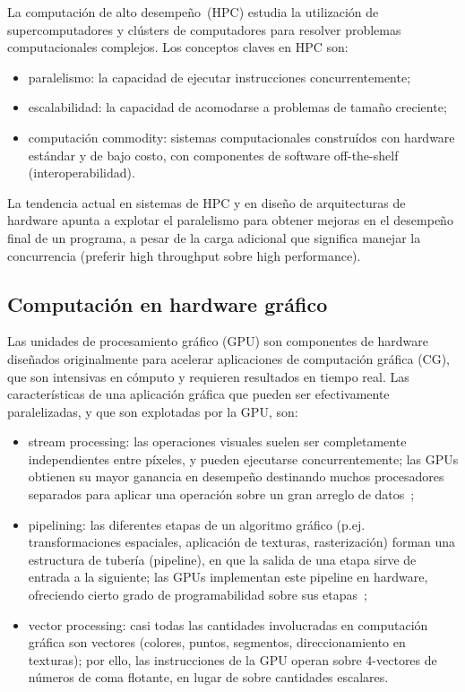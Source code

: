 \documentclass[11pt,spanish]{article}
\begin{document}
La computación de alto desempeño~(HPC) estudia la utilización de supercomputadores y
clústers de computadores para resolver problemas computacionales complejos.  Los
conceptos claves en HPC son:
\begin{itemize}
   \item paralelismo:
     la capacidad de ejecutar instrucciones concurrentemente;
   \item escalabilidad:
     la capacidad de acomodarse a problemas de tamaño creciente;
   \item computación commodity:
     sistemas computacionales construídos con hardware
     estándar y de bajo costo, con componentes de software off-the-shelf
     (interoperabilidad).
\end{itemize}
La tendencia actual en sistemas de HPC y en diseño de arquitecturas de hardware
apunta a explotar el paralelismo para obtener mejoras en el desempeño final de un
programa, a pesar de la carga adicional que significa manejar la concurrencia
(preferir high throughput sobre high performance).

\subsection{Computación en hardware gráfico}
Las unidades de procesamiento gráfico (GPU) son componentes de hardware diseñados
originalmente para acelerar aplicaciones de computación gráfica (CG), que son
intensivas en cómputo y requieren resultados en tiempo real.  Las
características de una aplicación gráfica que pueden ser efectivamente
paralelizadas, y que son explotadas por la GPU, son:
\begin{itemize}
  \item stream processing:
    las operaciones visuales suelen ser completamente independientes entre
    píxeles, y pueden ejecutarse concurrentemente;  las GPUs obtienen su mayor
    ganancia en desempeño destinando muchos procesadores
    separados para aplicar una operación sobre un gran arreglo de
    datos~\cite[\S3.2]{gpupp};
  \item pipelining:
    las diferentes etapas de un algoritmo gráfico (p.ej.
    transformaciones espaciales, aplicación de texturas, rasterización)
    forman una estructura de tubería (pipeline), en que la salida de una etapa
    sirve de entrada a la siguiente;  las GPUs implementan este pipeline en
    hardware, ofreciendo cierto grado de programabilidad sobre sus
    etapas~\cite[\S3.1]{pygpu};
  \item vector processing:
    casi todas las cantidades involucradas en computación
    gráfica son vectores (colores, puntos, segmentos, direccionamiento en
    texturas); por ello, las instrucciones de la GPU operan sobre 4-vectores de
    números de coma flotante, en lugar de sobre cantidades escalares.
    \cite[\S3.3]{gpupp}
\end{itemize}
\end{document}
